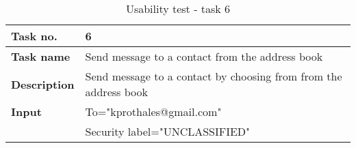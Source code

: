 \begin{table}[h!]
\begin{center}
\begin{tabular}{>{\bfseries}l|l}\hline
Task no.&6\\ \hline
Task name&Send message to a contact from the address book\\ \hline
Description&Send message to a contact by choosing from from the address book\\ \hline
Input&To="kprothales@gmail.com"\\
&Security label="UNCLASSIFIED"\\ \hline
\end{tabular}
\end{center}
\caption{Usability test - task 6} \label{tab:usabilitytask6}
\end{table}